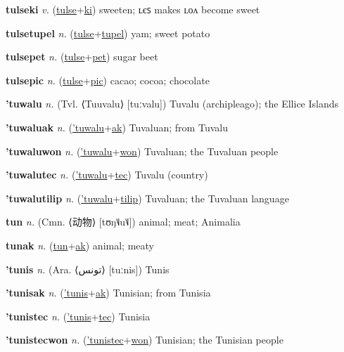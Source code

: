 \textbf{\hypertarget{tulseki}{tulseki}} \textit{v.} (\hyperlink{tulse}{tulse}+\allowbreak \hyperlink{ki}{ki})
sweeten; ʟєꜱ makes ʟᴏᴧ become sweet

\textbf{\hypertarget{tulsetupel}{tulsetupel}} \textit{n.} (\hyperlink{tulse}{tulse}+\allowbreak \hyperlink{tupel}{tupel})
yam; sweet potato

\textbf{\hypertarget{tulsepet}{tulsepet}} \textit{n.} (\hyperlink{tulse}{tulse}+\allowbreak \hyperlink{pet}{pet})
sugar beet

\textbf{\hypertarget{tulsepic}{tulsepic}} \textit{n.} (\hyperlink{tulse}{tulse}+\allowbreak \hyperlink{pic}{pic})
cacao; cocoa; chocolate

\textbf{\hypertarget{'tuwalu}{'tuwalu}} \textit{n.} (Tvl. ⟨Tuuvalu⟩ [tuːvalu])
Tuvalu (archipleago); the Ellice Islands

\textbf{\hypertarget{'tuwaluak}{'tuwaluak}} \textit{n.} (\hyperlink{'tuwalu}{'tuwalu}+\allowbreak \hyperlink{ak}{ak})
Tuvaluan; from Tuvalu

\textbf{\hypertarget{'tuwaluwon}{'tuwaluwon}} \textit{n.} (\hyperlink{'tuwalu}{'tuwalu}+\allowbreak \hyperlink{won}{won})
Tuvaluan; the Tuvaluan people

\textbf{\hypertarget{'tuwalutec}{'tuwalutec}} \textit{n.} (\hyperlink{'tuwalu}{'tuwalu}+\allowbreak \hyperlink{tec}{tec})
Tuvalu (country)

\textbf{\hypertarget{'tuwalutilip}{'tuwalutilip}} \textit{n.} (\hyperlink{'tuwalu}{'tuwalu}+\allowbreak \hyperlink{tilip}{tilip})
Tuvaluan; the Tuvaluan language

\textbf{\hypertarget{tun}{tun}} \textit{n.} (Cmn. ⟨{\chinese{}动物}⟩ [tʊŋ˥˩u˥˩])
animal; meat; Animalia

\textbf{\hypertarget{tunak}{tunak}} \textit{n.} (\hyperlink{tun}{tun}+\allowbreak \hyperlink{ak}{ak})
animal; meaty

\textbf{\hypertarget{'tunis}{'tunis}} \textit{n.} (Ara. ⟨{\arabics{}تونس}⟩ [tuːnis])
Tunis

\textbf{\hypertarget{'tunisak}{'tunisak}} \textit{n.} (\hyperlink{'tunis}{'tunis}+\allowbreak \hyperlink{ak}{ak})
Tunisian; from Tunisia

\textbf{\hypertarget{'tunistec}{'tunistec}} \textit{n.} (\hyperlink{'tunis}{'tunis}+\allowbreak \hyperlink{tec}{tec})
Tunisia

\textbf{\hypertarget{'tunistecwon}{'tunistecwon}} \textit{n.} (\hyperlink{'tunistec}{'tunistec}+\allowbreak \hyperlink{won}{won})
Tunisian; the Tunisian people

